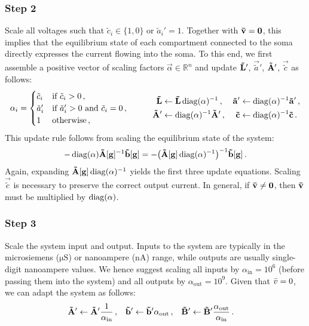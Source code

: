 \subsubsection{Step 2}
Scale all voltages such that $\tilde c_i \in \{1, 0\}$ or $\tilde a_i' = 1$.
Together with ${{\mathbf{\bar v}}} = \mathbf{0}$, this implies that the equilibrium state of each compartment connected to the soma directly expresses the current flowing into the soma.
To this end, we first assemble a positive vector of scaling factors $\vec{\alpha} \in \mathbb{R}^n$ and update $\mathbf{\tilde L}'$, $\vec{\tilde a}'$, $\mathbf{\tilde A}'$, $\vec{\tilde c}$ as follows:
\begin{align*}
	\begin{aligned}
	\alpha_i &= \begin{cases}
		{\tilde c}_i & \text{if } {\tilde c}_i > 0 \,, \\
		{\tilde a}'_i & \text{if } {\tilde a}'_i > 0 \text{ and } {\tilde c}_i = 0 \,, \\
		1 & \text{otherwise} \,,
	\end{cases}
	\end{aligned}
	\quad
	\quad
	\begin{aligned}
	\mathbf{\tilde L} &\gets \mathbf{\tilde L} \operatorname{\mathrm{diag}}(\mathbf{\alpha})^{-1} \,, &
	\mathbf{\tilde a}' &\gets \operatorname{\mathrm{diag}}(\mathbf{\alpha})^{-1} \mathbf{\tilde a}' \,, \\
	\mathbf{\tilde A}' &\gets \operatorname{\mathrm{diag}}(\mathbf{\alpha})^{-1} \mathbf{\tilde A}' \,, &
	\mathbf{\tilde c} &\gets \operatorname{\mathrm{diag}}(\mathbf{\alpha})^{-1} \mathbf{\tilde c} \,.
	\end{aligned}
\end{align*}
This update rule follows from scaling the equilibrium state of the \nlif system:
\begin{align*}
	- \operatorname{\mathrm{diag}}(\mathbf{\alpha}) \mathbf{\tilde A}[\mathbf{g}]^{-1} \mathbf{\tilde b}[\mathbf{g}]
	= - \bigl( \mathbf{\tilde A}[\mathbf{g}] \operatorname{\mathrm{diag}}(\mathbf{\alpha})^{-1} \bigr)^{-1} \mathbf{\tilde b}[\mathbf{g}] \,.
\end{align*}
Again, expanding $\mathbf{\tilde A}[\mathbf{g}] \operatorname{\mathrm{diag}}(\mathbf{\alpha})^{-1}$ yields the first three update equations.
Scaling $\vec{\tilde c}$ is necessary to preserve the correct output current.
In general, if ${{\mathbf{\bar v}}} \neq \mathbf{0}$, then ${{\mathbf{\bar v}}}$ must be multiplied by $\operatorname{\mathrm{diag}}(\mathbf{\alpha})$.

\subsubsection{Step 3}
Scale the system input and output.
Inputs to the \nlif system are typically in the microsiemens ($\si{\micro\siemens}$) or nanoampere ($\si{\nano\ampere}$) range, while outputs are usually single-digit nanoampere values.
We hence suggest scaling all inputs by $\alpha_\mathrm{in} = 10^6$ (before passing them into the system) and all outputs by $\alpha_\mathrm{out} = 10^9$.
Given that ${{\bar v}} = 0$, we can adapt the system as follows:
\begin{align*}
	\mathbf{\tilde A}' &\gets \mathbf{\tilde A}' \frac{1}{\alpha_\mathrm{in}} \,, &
	\mathbf{\tilde b}' &\gets \mathbf{\tilde b}' \alpha_\mathrm{out} \,, &
	\mathbf{\tilde B}' &\gets \mathbf{\tilde B}' \frac{\alpha_\mathrm{out}}{\alpha_\mathrm{in}} \,.
\end{align*}

